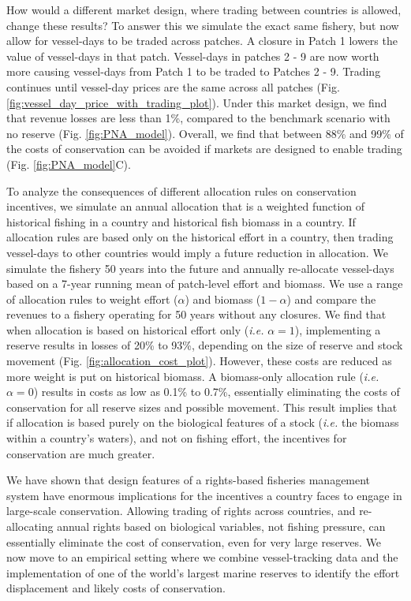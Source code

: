 \documentclass[12pt]{article}
\begin{document}
How would a different market design, where trading between countries is allowed, change these results? To answer this we simulate the exact same fishery, but now allow for vessel-days to be traded across patches. A closure in Patch 1 lowers the value of vessel-days in that patch. Vessel-days in patches 2 - 9 are now worth more causing vessel-days from Patch 1 to be traded to Patches 2 - 9. Trading continues until vessel-day prices are the same across all patches (Fig. \ref{fig:vessel_day_price_with_trading_plot}). Under this market design, we find that revenue losses are less than 1\%, compared to the benchmark scenario with no reserve (Fig. \ref{fig:PNA_model}). Overall, we find that between 88\% and 99\% of the costs of conservation can be avoided if markets are designed to enable trading (Fig. \ref{fig:PNA_model}C).

To analyze the consequences of different allocation rules on conservation incentives, we simulate an annual allocation that is a weighted function of historical fishing in a country and historical fish biomass in a country. If allocation rules are based only on the historical effort in a country, then trading vessel-days to other countries would imply a future reduction in allocation. We simulate the fishery 50 years into the future and annually re-allocate vessel-days based on a 7-year running mean of patch-level effort and biomass. We use a range of allocation rules to weight effort ($\alpha$) and biomass ($1 - \alpha$) and compare the revenues to a fishery operating for 50 years without any closures. We find that when allocation is based on historical effort only (\emph{i.e.} $\alpha = 1$), implementing a reserve results in losses of 20\% to 93\%, depending on the size of reserve and stock movement (Fig. \ref{fig:allocation_cost_plot}). However, these costs are reduced as more weight is put on historical biomass. A biomass-only allocation rule (\emph{i.e.} $\alpha = 0$) results in costs as low as 0.1\% to 0.7\%, essentially eliminating the costs of conservation for all reserve sizes and possible movement. This result implies that if allocation is based purely on the biological features of a stock (\emph{i.e.} the biomass within a country's waters), and not on fishing effort, the incentives for conservation are much greater.

We have shown that design features of a rights-based fisheries management system have enormous implications for the incentives a country faces to engage in large-scale conservation. Allowing trading of rights across countries, and re-allocating annual rights based on biological variables, not fishing pressure, can essentially eliminate the cost of conservation, even for very large reserves. We now move to an empirical setting where we combine vessel-tracking data and the implementation of one of the world's largest marine reserves to identify the effort displacement and likely costs of conservation.
\end{document}

